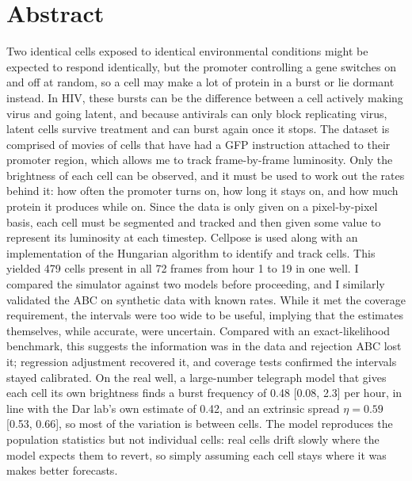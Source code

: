 \chapter*{Abstract}

Two identical cells exposed to identical environmental conditions might be expected to respond identically, but the promoter controlling a gene switches on and off at random, so a cell may make a lot of protein in a burst or lie dormant instead. In HIV, these bursts can be the difference between a cell actively making virus and going latent, and because antivirals can only block replicating virus, latent cells survive treatment and can burst again once it stops. The dataset is comprised of movies of cells that have had a GFP instruction attached to their promoter region, which allows me to track frame-by-frame luminosity. Only the brightness of each cell can be observed, and it must be used to work out the rates behind it: how often the promoter turns on, how long it stays on, and how much protein it produces while on. Since the data is only given on a pixel-by-pixel basis, each cell must be segmented and tracked and then given some value to represent its luminosity at each timestep. Cellpose is used along with an implementation of the Hungarian algorithm to identify and track cells. This yielded 479 cells present in all 72 frames from hour 1 to 19 in one well. I compared the simulator against two models before proceeding, and I similarly validated the ABC on synthetic data with known rates. While it met the coverage requirement, the intervals were too wide to be useful, implying that the estimates themselves, while accurate, were uncertain. Compared with an exact-likelihood benchmark, this suggests the information was in the data and rejection ABC lost it; regression adjustment recovered it, and coverage tests confirmed the intervals stayed calibrated. On the real well, a large-number telegraph model that gives each cell its own brightness finds a burst frequency of 0.48 [0.08, 2.3] per hour, in line with the Dar lab's own estimate of 0.42, and an extrinsic spread $\eta = 0.59$ [0.53, 0.66], so most of the variation is between cells. The model reproduces the population statistics but not individual cells: real cells drift slowly where the model expects them to revert, so simply assuming each cell stays where it was makes better forecasts.
